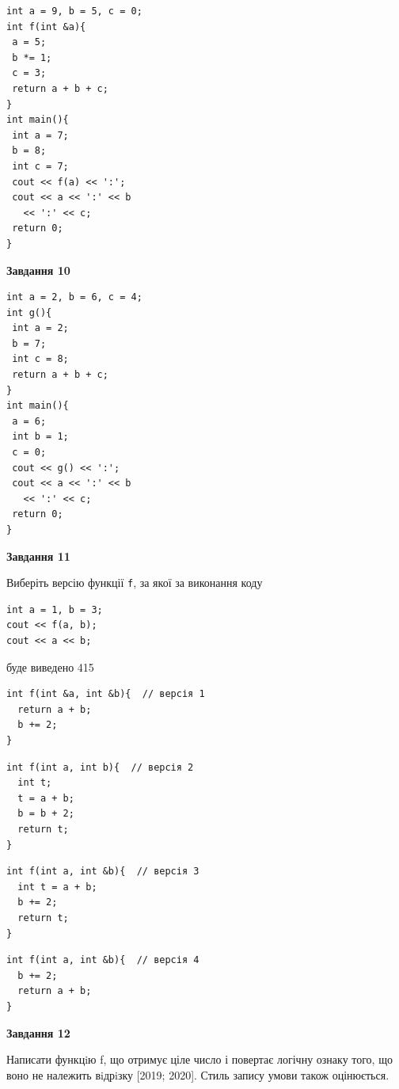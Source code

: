 \documentclass[12pt, ukrainian]{article}
\def\code#1{\Verb!#1!}
\begin{document}
{\begin {large}
\begin{minipage}[t]{7.0cm}
\begin{verbatim}
int a = 9, b = 5, c = 0;
int f(int &a){
 a = 5;
 b *= 1;
 c = 3;
 return a + b + c;
}
int main(){
 int a = 7;
 b = 8;
 int c = 7;
 cout << f(a) << ':';
 cout << a << ':' << b 
   << ':' << c;
 return 0;
}
\end{verbatim}



\begin{center}
\textbf{Завдання 10}
\end{center}
\vspace{-8mm}

\begin{verbatim}
int a = 2, b = 6, c = 4;
int g(){
 int a = 2;
 b = 7;
 int c = 8;
 return a + b + c;
}
int main(){
 a = 6;
 int b = 1;
 c = 0;
 cout << g() << ':';
 cout << a << ':' << b 
   << ':' << c;
 return 0;
}
\end{verbatim}

\end{minipage}
\vline \hspace{1mm}
\begin{minipage}[t]{11.0cm}

\begin{center}
\textbf{Завдання 11}
\end{center}
Виберіть версію функції \code{f}, за якої за виконання коду
\begin{verbatim}
int a = 1, b = 3;
cout << f(a, b);
cout << a << b;
\end{verbatim}

буде виведено 415

\begin{verbatim}
int f(int &a, int &b){  // версія 1
  return a + b;
  b += 2;
}
\end{verbatim}

\vspace{-8mm}\begin{verbatim}
int f(int a, int b){  // версія 2
  int t;
  t = a + b;
  b = b + 2;
  return t;
}
\end{verbatim}

\vspace{-8mm}\begin{verbatim}
int f(int a, int &b){  // версія 3
  int t = a + b;
  b += 2;
  return t;
}
\end{verbatim}

\vspace{-8mm}\begin{verbatim}
int f(int a, int &b){  // версія 4
  b += 2;
  return a + b;
}
\end{verbatim}



\begin{center}
\textbf{Завдання 12}
\end{center}

Написати функцiю f, що отримує ціле число і повертає логічну ознаку того, що воно не належить вiдрiзку [2019; 2020]. Стиль запису умови також оцінюється.\par

\end{minipage}

\end {large}}
\end{document}
